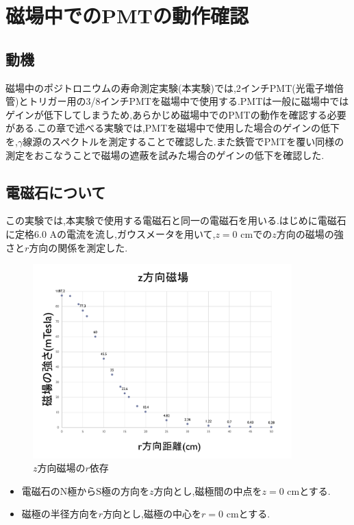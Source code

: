 \chapter{磁場中でのPMTの動作確認}\label{PMT}

\section{動機}
磁場中のポジトロニウムの寿命測定実験(本実験)では,2インチPMT(光電子増倍管)とトリガー用の3/8インチPMTを磁場中で使用する.PMTは一般に磁場中ではゲインが低下してしまうため,あらかじめ磁場中でのPMTの動作を確認する必要がある.この章で述べる実験では,PMTを磁場中で使用した場合のゲインの低下を,$\gamma$線源のスペクトルを測定することで確認した.また鉄管でPMTを覆い同様の測定をおこなうことで磁場の遮蔽を試みた場合のゲインの低下を確認した.



\section{電磁石について}
この実験では,本実験で使用する電磁石と同一の電磁石を用いる.はじめに電磁石に定格6.0 Aの電流を流し,ガウスメータを用いて,$z=0$ cmでの$z$方向の磁場の強さと$r$方向の関係を測定した.
\begin{figure}[H]
	\centering
		\includegraphics[width=10cm]{fig/iguchi/maggraph1.pdf}
	\caption{$z$方向磁場の$r$依存}
	\label{maggraph1}
\end{figure}

\begin{itemize}
       \item 電磁石のN極からS極の方向を$z$方向とし,磁極間の中点を$z=0$ cmとする.
       \item 磁極の半径方向を$r$方向とし,磁極の中心を$r=0$ cmとする.
\end{itemize}

